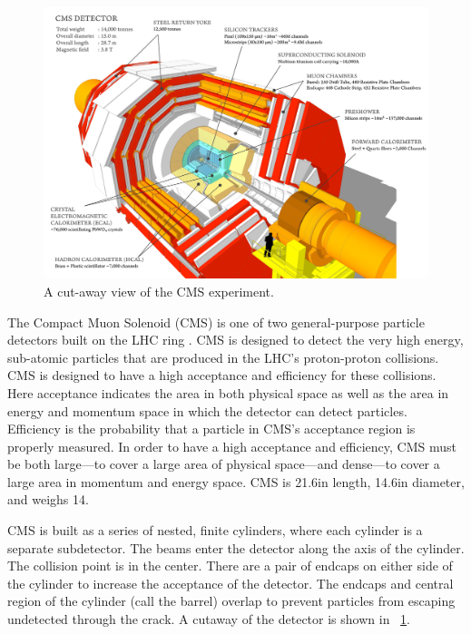 \begin{figure}[!htbp]
    \centering
    \includegraphics[width=\textwidth]{figures/cms_cutaway.pdf}
    \caption{
        A cut-away view of the CMS experiment.
    }
    \label{fig:cms_cutaway}
\end{figure}

The Compact Muon Solenoid (CMS) is one of two general-purpose particle
detectors built on the LHC ring \cite{cms_tdr_1}\cite{cms_tdr_2}. CMS is
designed to detect the very high energy, sub-atomic particles that are produced
in the LHC's proton-proton collisions. CMS is designed to have a high
acceptance and efficiency for these collisions. Here acceptance indicates the
area in both physical space as well as the area in energy and momentum space in
which the detector can detect particles. Efficiency is the probability that a
particle in CMS's acceptance region is properly measured. In order to have a
high acceptance and efficiency, CMS must be both large---to cover a large area
of physical space---and dense---to cover a large area in momentum and energy
space. CMS is 21.6\meters in length, 14.6\meters in diameter, and weighs
14\kilotonne.

CMS is built as a series of nested, finite cylinders, where each cylinder is a
separate subdetector. The beams enter the detector along the axis of the
cylinder. The collision point is in the center. There are a pair of endcaps on
either side of the cylinder to increase the acceptance of the detector. The
endcaps and central region of the cylinder (call the barrel) overlap to prevent
particles from escaping undetected through the crack. A cutaway of the detector
is shown in \FIG~\ref{fig:cms_cutaway}.

